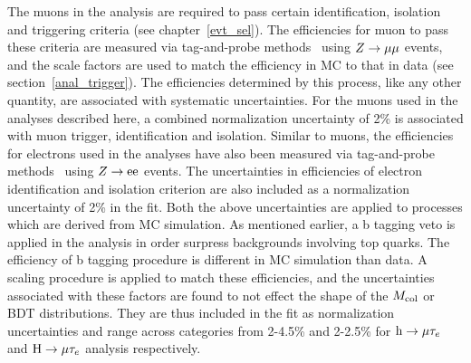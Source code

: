 The muons in the analysis are required to pass certain identification, isolation and triggering criteria (see chapter~\ref{evt_sel}). The efficiencies for muon to pass these criteria are measured via tag-and-probe methods~\cite{muon_recon2018} using $Z\rightarrow\mu\mu$ events, and the scale factors are used to match the efficiency in MC to that in data (see section~\ref{anal_trigger}). The efficiencies determined by this process, like any other quantity, are associated with systematic  uncertainties. For the muons used in the analyses described here, a combined normalization uncertainty of 2\% is associated with muon trigger, identification and isolation. Similar to muons, the efficiencies for electrons used in the analyses have also been measured via tag-and-probe methods~\cite{e_recon} using $Z\rightarrow\text{e}\text{e}$ events. The uncertainties in efficiencies  of electron identification and isolation criterion are also included as a normalization uncertainty of 2\% in the fit. Both the above uncertainties are applied to processes which are derived from MC simulation. As mentioned earlier, a b tagging veto is applied in the analysis in order surpress backgrounds involving top quarks. The efficiency of b tagging procedure is different in MC simulation than data. A scaling procedure is applied to match these efficiencies, and the uncertainties associated with these factors are found to not effect the shape of the $M_{\text{col}}$ or BDT distributions. They are thus included in the fit as normalization uncertainties and range across categories from 2-4.5\% and 2-2.5\% for $\text{h} \to \mu \tau_{e}$ and $\text{H} \to \mu \tau_{e}$ analysis respectively.

